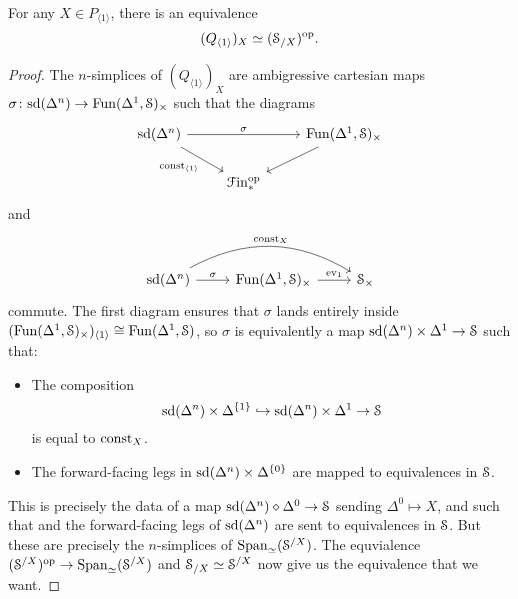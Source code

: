 \documentclass[main.tex]{subfiles}
\begin{document}
\begin{proposition}
  For any $X \in P_{\langle 1 \rangle}$, there is an equivalence
  \begin{equation*}
    (Q_{\langle 1 \rangle})_{X} \simeq (\S_{/X})\op.
  \end{equation*}
\end{proposition}
\begin{proof}
  The $n$-simplices of $(Q_{\langle 1 \rangle})_{X}$ are ambigressive cartesian maps $\sigma\colon \sd(\Delta^{n}) \to \Fun(\Delta^{1}, \S)_{\times}$ such that the diagrams
  \begin{equation*}
    \begin{tikzcd}
      \sd(\Delta^{n})
      \arrow[rr, "\sigma"]
      \arrow[dr, swap, "\const_{\langle 1 \rangle}"]
      && \Fun(\Delta^{1}, \S)_{\times}
      \arrow[dl]
      \\
      & \Finp\op
    \end{tikzcd}
  \end{equation*}
  and
  \begin{equation*}
    \begin{tikzcd}
      \sd(\Delta^{n})
      \arrow[rr, bend left, "\const_{X}"]
      \arrow[r, "\sigma"]
      & \Fun(\Delta^{1}, \S)_{\times}
      \arrow[r, "\ev_{1}"]
      & \S_{\times}
    \end{tikzcd}
  \end{equation*}
  commute. The first diagram ensures that $\sigma$ lands entirely inside $(\Fun(\Delta^{1}, \S)_{\times})_{\langle 1 \rangle} \cong \Fun(\Delta^{1}, \S)$, so $\sigma$ is equivalently a map $\sd(\Delta^{n}) \times \Delta^{1} \to \S$ such that:
  \begin{itemize}
    \item The composition
      \begin{equation*}
        \sd(\Delta^{n}) \times \Delta^{\{1\}} \hookrightarrow \sd(\Delta^{n}) \times \Delta^{1} \to \S
      \end{equation*}
      is equal to $\const_{X}$.

    \item The forward-facing legs in $\sd(\Delta^{n}) \times \Delta^{\{0\}}$ are mapped to equivalences in $\S$.
  \end{itemize}
  This is precisely the data of a map $\sd(\Delta^{n}) \diamond \Delta^{0} \to \S$ sending $\Delta^{0} \mapsto X$, and such that and the forward-facing legs of $\sd(\Delta^{n})$ are sent to equivalences in $\S$. But these are precisely the $n$-simplices of $\Span_{\simeq}(\S^{/X})$. The equvialence $(\S^{/X})\op \to \Span_{\simeq}(\S^{/X})$ and $\S_{/X} \simeq \S^{/X}$ now give us the equivalence that we want.
\end{proof}
\end{document}
